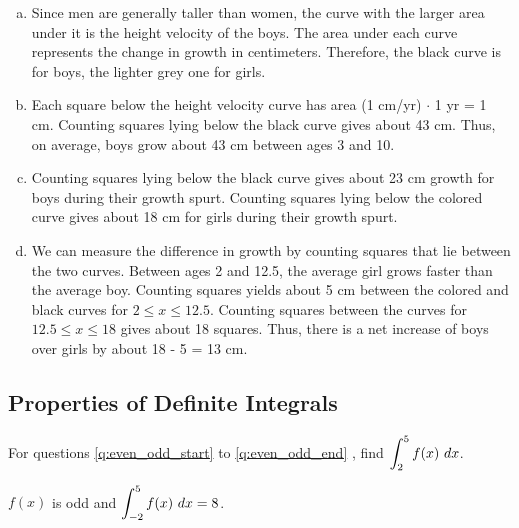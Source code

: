 \begin{enumerate}[1.]
\begin{multicols}{2}
  \begin{Solution}
    \begin{enumerate}[(a)]
    \item Since men are generally taller than women, the curve with
      the larger area under it is the height velocity of the boys.
      The area under each curve represents the change in growth in
      centimeters.  Therefore, the black curve is for boys, the
      lighter grey one for girls.
    \item Each square below the height velocity curve has area (1 cm/yr) $\cdot$
       1 yr = 1 cm. Counting squares lying below the black curve
      gives about 43 cm. Thus, on average, boys grow about 43 cm
      between ages 3 and 10.
    \item Counting squares lying below the black curve gives about 23
      cm growth for boys during their growth spurt. Counting squares
      lying below the colored curve gives about 18 cm for girls during
      their growth spurt.
    \item We can measure the difference in growth by counting squares
      that lie between the two curves. Between ages 2 and 12.5, the
      average girl grows faster than the average boy. Counting squares
      yields about 5 cm between the colored and black curves for $2 \le
      x \le 12.5$. Counting squares between the curves for $12.5 \le x \le
      18$ gives about 18 squares.  Thus, there is a net increase of
      boys over girls by about 18 - 5 = 13 cm.
    \end{enumerate}
  \end{Solution}

\end{multicols}

\hrulefill

\subsection*{Properties of Definite Integrals}

\begin{multicols}{2}
\begin{Question}
\item[~] For questions \ref{q:even_odd_start} to \ref{q:even_odd_end} , find $\displaystyle \int_2^5 f(x)~dx$.
\end{Question}
\item \label{q:even_odd_start}
  \begin{Question}
   $f(x)$ is odd and $\displaystyle \int_{-2}^5 f(x)~dx = 8$.
  \end{Question}


\end{multicols}
\end{enumerate}
